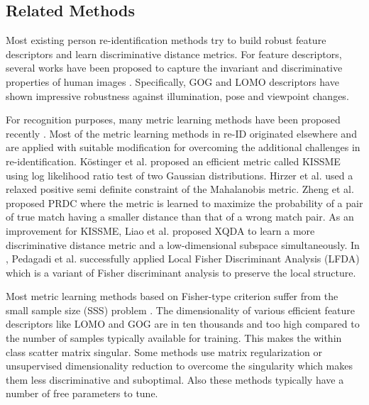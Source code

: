 \documentclass[runningheads]{llncs}
\begin{document}
\subsection{Related Methods}
Most existing person re-identification methods try to build robust feature descriptors and learn discriminative distance metrics. For feature descriptors, several works have been proposed to capture the invariant and discriminative properties of human images \cite{SDALF,LOMO,GOG,ELF,ColorInvariants,midlevel,colornames,LisantiPAMI14}. Specifically, GOG\cite{GOG} and LOMO\cite{LOMO} descriptors have shown impressive robustness against illumination, pose and viewpoint changes.


For recognition purposes, many metric learning methods have been proposed recently \cite{PRDC,RPLM,LFDA:CVPR,rPcca,KISSME,LOMO,ExPolyFeatMap,Zheng:nfst,SSSVM}. Most of the metric learning methods in re-ID originated elsewhere and are applied with suitable modification for overcoming the additional challenges in re-identification. Köstinger et al. proposed an efficient metric called KISSME \cite{KISSME} using log likelihood ratio test of two Gaussian distributions. Hirzer et al. \cite{RPLM} used a relaxed positive semi definite constraint of the Mahalanobis metric. Zheng et al. proposed PRDC\cite{PRDC} where the  metric is learned to maximize the probability of a pair of true match having a smaller distance than that of a wrong match pair.
As an improvement for KISSME\cite{KISSME}, Liao et al. proposed XQDA\cite{LOMO} to learn a more discriminative distance metric and a low-dimensional subspace simultaneously. In \cite{LFDA:CVPR}, Pedagadi et al. successfully applied  Local Fisher Discriminant Analysis (LFDA) \cite{LFDA:ICML} which is a variant of Fisher discriminant analysis to preserve the local structure.

Most metric learning methods based on Fisher-type criterion suffer from the small sample size (SSS) problem \cite{Zheng:nfst,guo:nfst}. The dimensionality of various efficient feature descriptors like LOMO\cite{LOMO} and GOG\cite{GOG} are in ten thousands and too high compared to the number of samples typically available for training. This makes the within class scatter matrix singular. Some methods use matrix regularization  \cite{LFDA:CVPR,rPcca,LOMO,LisantiDSC,GOG} or unsupervised dimensionality reduction \cite{KISSME,LFDA:CVPR} to overcome the singularity which makes them less discriminative and suboptimal. Also these methods typically  have a number of free parameters to tune. 
\end{document}
